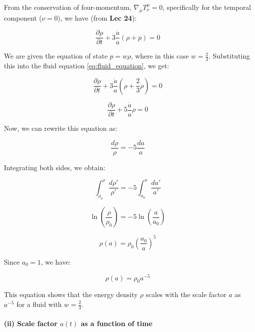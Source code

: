 \documentclass{article}
\begin{document}
From the conservation of four-momentum, $\nabla_\mu T^\mu_\nu = 0$, specifically for the temporal component ($\nu = 0$), we have (from \textbf{Lec 24}):

\begin{equation} \label{eq:fluid_equation}
\frac{\partial \rho}{\partial t} + 3\frac{\dot{a}}{a}(\rho + p) = 0
\end{equation}

We are given the equation of state $p = w\rho$, where in this case $w = \frac{2}{3}$. Substituting this into the fluid equation \eqref{eq:fluid_equation}, we get:

\begin{equation}
\frac{\partial \rho}{\partial t} + 3\frac{\dot{a}}{a}\left(\rho + \frac{2}{3}\rho\right) = 0
\end{equation}

\begin{equation}
\frac{\partial \rho}{\partial t} + 5\frac{\dot{a}}{a}\rho = 0
\end{equation}

Now, we can rewrite this equation as:

\begin{equation}
\frac{d\rho}{\rho} = -5 \frac{da}{a}
\end{equation}

Integrating both sides, we obtain:

\begin{equation}
\int_{\rho_0}^{\rho} \frac{d\rho'}{\rho'} = -5 \int_{a_0}^{a} \frac{da'}{a'}
\end{equation}

\begin{equation}
\ln\left(\frac{\rho}{\rho_0}\right) = -5 \ln\left(\frac{a}{a_0}\right)
\end{equation}

\begin{equation}
\rho(a) = \rho_0 \left(\frac{a_0}{a}\right)^5
\end{equation}

Since $a_0 = 1$, we have:

\begin{equation}
\rho(a) = \rho_0 a^{-5}
\end{equation}

This equation shows that the energy density $\rho$ scales with the scale factor $a$ as $a^{-5}$ for a fluid with $w = \frac{2}{3}$.

\paragraph{(ii) Scale factor $a(t)$ as a function of time}
\end{document}
